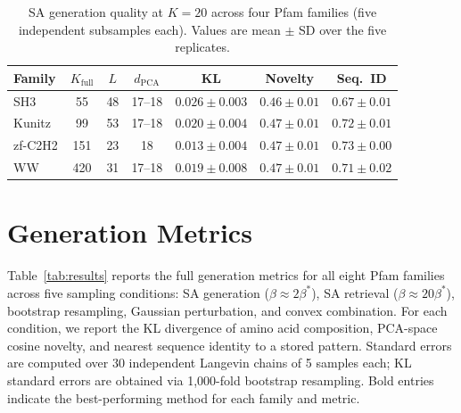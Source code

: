 \begin{table}[ht]
\centering
\small
\caption{SA generation quality at $K{=}20$ across four Pfam families (five independent subsamples each). Values are mean $\pm$ SD over the five replicates.}
\label{tab:multifamily-k20}
\begin{tabular}{lcccccc}
\toprule
Family & $K_{\mathrm{full}}$ & $L$ & $d_{\mathrm{PCA}}$ & KL & Novelty & Seq.\ ID \\
\midrule
SH3     & 55  & 48 & 17--18 & $0.026 \pm 0.003$ & $0.46 \pm 0.01$ & $0.67 \pm 0.01$ \\
Kunitz  & 99  & 53 & 17--18 & $0.020 \pm 0.004$ & $0.47 \pm 0.01$ & $0.72 \pm 0.01$ \\
zf-C2H2 & 151 & 23 & 18     & $0.013 \pm 0.004$ & $0.47 \pm 0.01$ & $0.73 \pm 0.00$ \\
WW      & 420 & 31 & 17--18 & $0.019 \pm 0.008$ & $0.47 \pm 0.01$ & $0.71 \pm 0.02$ \\
\bottomrule
\end{tabular}
\end{table}

\section{Generation Metrics}\label{si:generation-metrics}

Table~\ref{tab:results} reports the full generation metrics for all eight Pfam families across five sampling conditions: SA generation ($\beta \approx 2\beta^*$), SA retrieval ($\beta \approx 20\beta^*$), bootstrap resampling, Gaussian perturbation, and convex combination. For each condition, we report the KL divergence of amino acid composition, PCA-space cosine novelty, and nearest sequence identity to a stored pattern. Standard errors are computed over 30 independent Langevin chains of 5 samples each; KL standard errors are obtained via 1{,}000-fold bootstrap resampling. Bold entries indicate the best-performing method for each family and metric.

